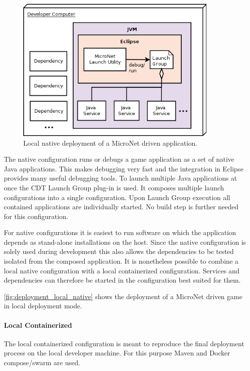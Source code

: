 \begin{figure}
	\centering
	\includegraphics[width=10cm]{images/architecture/DeploymentLocalNative}
	\caption{Local native deployment of a MicroNet driven application.}
	\label{fig:deployment_local_native}
\end{figure}

The native configuration runs or debugs a game application as a set of native
Java applications. This makes debugging very fast and the integration in Eclipse
provides many useful debugging tools. To launch multiple Java applications at
once the CDT Launch Group plug-in is used. It composes multiple launch
configurations into a single configuration. Upon Launch Group execution all
contained applications are individually started. No build step is further needed
for this configuration.

For native configurations it is easiest to run software on which the application
depends as stand-alone installations on the host. Since the native configuration
is solely used during development this also allows the dependencies to be tested
isolated from the composed application. It is nonetheless possible to combine a
local native configuration with a local containerized configuration. Services
and dependencies can therefore be started in the configuration best suited for
them.

\autoref{fig:deployment_local_native} shows the deployment of a MicroNet
driven game in local deployment mode.

\paragraph{Local Containerized}

The local containerized configuration is meant to reproduce the final deployment
process on the local developer machine. For this purpose Maven and Docker
compose/swarm are used. 

